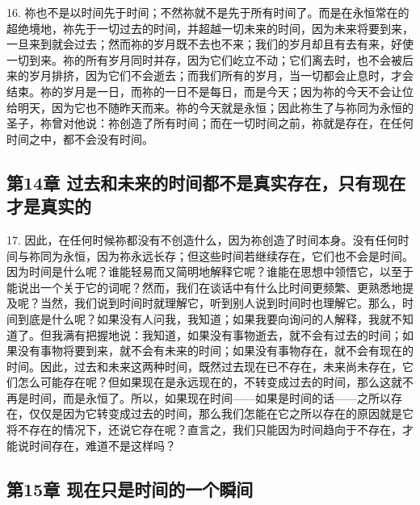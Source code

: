16. 祢也不是以时间先于时间；不然祢就不是先于所有时间了。而是在永恒常在的超绝境地，祢先于一切过去的时间，并超越一切未来的时间，因为未来将要到来，一旦来到就会过去；然而祢的岁月既不去也不来；我们的岁月却且有去有来，好使一切到来。祢的所有岁月同时并存，因为它们屹立不动；它们离去时，也不会被后来的岁月排挤，因为它们不会逝去；而我们所有的岁月，当一切都会止息时，才会结束。祢的岁月是一日，而祢的一日不是每日，而是今天；因为祢的今天不会让位给明天，因为它也不随昨天而来。祢的今天就是永恒；因此祢生了与祢同为永恒的圣子，祢曾对他说：祢创造了所有时间；而在一切时间之前，祢就是存在，在任何时间之中，都不会没有时间。\par


\subsection{第14章 过去和未来的时间都不是真实存在，只有现在才是真实的}

17. 因此，在任何时候祢都没有不创造什么，因为祢创造了时间本身。没有任何时间与祢同为永恒，因为祢永远长存；但这些时间若继续存在，它们也不会是时间。因为时间是什么呢？谁能轻易而又简明地解释它呢？谁能在思想中领悟它，以至于能说出一个关于它的词呢？然而，我们在谈话中有什么比时间更频繁、更熟悉地提及呢？当然，我们说到时间时就理解它，听到别人说到时间时也理解它。那么，时间到底是什么呢？如果没有人问我，我知道；如果我要向询问的人解释，我就不知道了。但我满有把握地说：我知道，如果没有事物逝去，就不会有过去的时间；如果没有事物将要到来，就不会有未来的时间；如果没有事物存在，就不会有现在的时间。因此，过去和未来这两种时间，既然过去现在已不存在，未来尚未存在，它们怎么可能存在呢？但如果现在是永远现在的，不转变成过去的时间，那么这就不再是时间，而是永恒了。所以，如果现在时间——如果是时间的话——之所以存在，仅仅是因为它转变成过去的时间，那么我们怎能在它之所以存在的原因就是它将不存在的情况下，还说它存在呢？直言之，我们只能因为时间趋向于不存在，才能说时间存在，难道不是这样吗？\par


\subsection{第15章 现在只是时间的一个瞬间}


